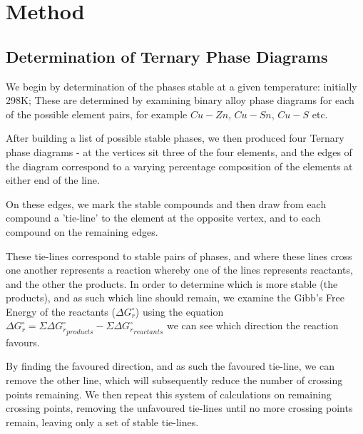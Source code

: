 
\chapter{Method} %

\label{Chapter2} %



\section{Determination of Ternary Phase Diagrams}

We begin by determination of the phases stable at a given temperature: initially 298K; These are determined by examining binary alloy phase diagrams for each of the possible element pairs, for example $Cu-Zn$, $Cu-Sn$, $Cu-S$ etc. 

After building a list of possible stable phases, we then produced four Ternary phase diagrams - at the vertices sit three of the four elements, and the edges of the diagram correspond to a varying percentage composition of the elements at either end of the line. 

On these edges, we mark the stable compounds and then draw from each compound a 'tie-line' to the element at the opposite vertex, and to each compound on the remaining edges. 

These tie-lines correspond to stable pairs of phases, and where these lines cross one another represents a reaction whereby one of the lines represents reactants, and the other the products. In order to determine which is more stable (the products), and as such which line should remain, we examine the Gibb's Free Energy of the reactants ($\Delta G_{r}^{\circ}$) using the equation $\Delta G_{r}^{\circ} = \Sigma\Delta {G_{r}^{\circ}}_{products} - \Sigma\Delta {G_{r}^{\circ}}_{reactants}$ we can see which direction the reaction favours.

By finding the favoured direction, and as such the favoured tie-line, we can remove the other line, which will subsequently reduce the number of crossing points remaining. We then repeat this system of calculations on remaining crossing points, removing the unfavoured tie-lines until no more crossing points remain, leaving only a set of stable tie-lines.

